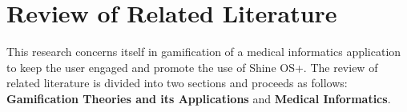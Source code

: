 \chapter{Review of Related Literature}

This research concerns itself in gamification of a medical informatics application to keep the user engaged and promote the use of Shine OS+. The review of related literature is divided into two sections and proceeds as follows: \textbf{Gamification Theories and its Applications} and \textbf{Medical Informatics}.




%
%

